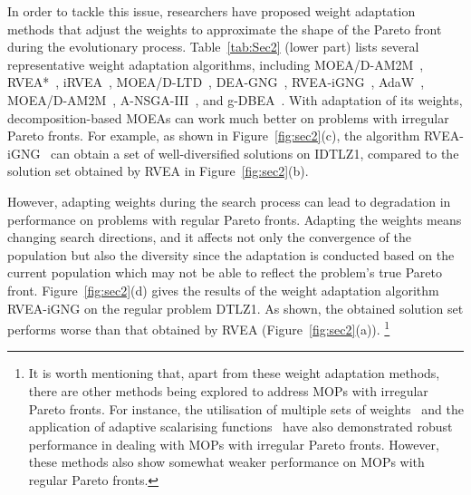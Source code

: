 In order to tackle this issue, researchers have proposed weight adaptation methods that adjust the weights to approximate the shape of the Pareto front during the evolutionary process. Table~\ref{tab:Sec2} (lower part) lists several representative weight adaptation algorithms, including MOEA/D-AM2M~\cite{Qi2014}, RVEA*~\cite{Cheng2016}, iRVEA~\cite{Liu2019b}, MOEA/D-LTD~\cite{Wu2018}, DEA-GNG~\cite{Liu2019}, RVEA-iGNG~\cite{Liu2020}, AdaW~\cite{Li2020}, MOEA/D-AM2M~\cite{Liu2017}, A-NSGA-III~\cite{Deb2014}, and g-DBEA~\cite{Asafuddoula2017}. 
With adaptation of its weights, decomposition-based MOEAs can work much better on problems with irregular Pareto fronts.
For example, 
as shown in Figure~\ref{fig:sec2}(c), 
the algorithm RVEA-iGNG~\cite{Liu2020} can obtain a set of well-diversified solutions on IDTLZ1,
compared to the solution set obtained by RVEA in Figure~\ref{fig:sec2}(b).




However, adapting weights during the search process can lead to degradation in performance on problems with regular Pareto fronts. 
Adapting the weights means changing search directions, 
and it affects not only the convergence of the population but also the diversity since the adaptation is conducted based on the current population which may not be able to reflect the problem's true Pareto front.  
Figure~\ref{fig:sec2}(d) gives the results of the weight adaptation algorithm RVEA-iGNG on the regular problem DTLZ1. 
As shown, the obtained solution set performs worse than that obtained by RVEA (Figure~\ref{fig:sec2}(a)). \footnote{It is worth mentioning that, apart from these weight adaptation methods, there are other methods being explored to address MOPs with irregular Pareto fronts. For instance, the utilisation of multiple sets of weights~\cite{He2023} and the application of adaptive scalarising functions~\cite{Ishibuchi2009, Wang2016, Pang2022} have also demonstrated robust performance in dealing with MOPs with irregular Pareto fronts. However, these methods also show somewhat weaker performance on MOPs with regular Pareto fronts.}


